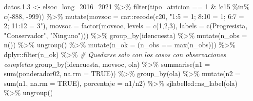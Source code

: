 \documentclass[
  12pt,
]{book}
\newenvironment{Shaded}{\begin{snugshade}}{\end{snugshade}}
\newcommand{\AttributeTok}[1]{\textcolor[rgb]{0.77,0.63,0.00}{#1}}
\newcommand{\CommentTok}[1]{\textcolor[rgb]{0.56,0.35,0.01}{\textit{#1}}}
\newcommand{\ConstantTok}[1]{\textcolor[rgb]{0.00,0.00,0.00}{#1}}
\newcommand{\DecValTok}[1]{\textcolor[rgb]{0.00,0.00,0.81}{#1}}
\newcommand{\FloatTok}[1]{\textcolor[rgb]{0.00,0.00,0.81}{#1}}
\newcommand{\FunctionTok}[1]{\textcolor[rgb]{0.00,0.00,0.00}{#1}}
\newcommand{\NormalTok}[1]{#1}
\newcommand{\OtherTok}[1]{\textcolor[rgb]{0.56,0.35,0.01}{#1}}
\newcommand{\SpecialCharTok}[1]{\textcolor[rgb]{0.00,0.00,0.00}{#1}}
\newcommand{\StringTok}[1]{\textcolor[rgb]{0.31,0.60,0.02}{#1}}
\begin{document}
\begin{Shaded}
\begin{Highlighting}[]
\NormalTok{datos.}\FloatTok{1.3} \OtherTok{\textless{}{-}}\NormalTok{ elsoc\_long\_2016\_2021 }\SpecialCharTok{\%\textgreater{}\%}
  \FunctionTok{filter}\NormalTok{(tipo\_atricion }\SpecialCharTok{==} \DecValTok{1} \SpecialCharTok{\&} \SpecialCharTok{!}\NormalTok{c15 }\SpecialCharTok{\%in\%} \FunctionTok{c}\NormalTok{(}\SpecialCharTok{{-}}\DecValTok{888}\NormalTok{, }\SpecialCharTok{{-}}\DecValTok{999}\NormalTok{)) }\SpecialCharTok{\%\textgreater{}\%} 
  \FunctionTok{mutate}\NormalTok{(}\AttributeTok{movsoc =}\NormalTok{ car}\SpecialCharTok{::}\FunctionTok{recode}\NormalTok{(c20, }\StringTok{"1:5 = 1; 8:10 = 1; 6:7 = 2; 11:12 = 3"}\NormalTok{),}
         \AttributeTok{movsoc =} \FunctionTok{factor}\NormalTok{(movsoc, }\AttributeTok{levels =} \FunctionTok{c}\NormalTok{(}\DecValTok{1}\NormalTok{,}\DecValTok{2}\NormalTok{,}\DecValTok{3}\NormalTok{),}
                         \AttributeTok{labels =} \FunctionTok{c}\NormalTok{(}\StringTok{\textquotesingle{}Progresista\textquotesingle{}}\NormalTok{, }\StringTok{"Conservador"}\NormalTok{, }\StringTok{"Ninguno"}\NormalTok{))) }\SpecialCharTok{\%\textgreater{}\%}
  \FunctionTok{group\_by}\NormalTok{(idencuesta) }\SpecialCharTok{\%\textgreater{}\%}
  \FunctionTok{mutate}\NormalTok{(}\AttributeTok{n\_obs =} \FunctionTok{n}\NormalTok{()) }\SpecialCharTok{\%\textgreater{}\%}
  \FunctionTok{ungroup}\NormalTok{() }\SpecialCharTok{\%\textgreater{}\%} 
  \FunctionTok{mutate}\NormalTok{(}\AttributeTok{n\_ok =}\NormalTok{ (n\_obs }\SpecialCharTok{==} \FunctionTok{max}\NormalTok{(n\_obs))) }\SpecialCharTok{\%\textgreater{}\%} 
\NormalTok{  dplyr}\SpecialCharTok{::}\FunctionTok{filter}\NormalTok{(n\_ok) }\SpecialCharTok{\%\textgreater{}\%}  \CommentTok{\# Quedarse solo con los casos con observaciones completas}
  \FunctionTok{group\_by}\NormalTok{(idencuesta, movsoc, ola) }\SpecialCharTok{\%\textgreater{}\%} 
  \FunctionTok{summarise}\NormalTok{(}\AttributeTok{n1 =} \FunctionTok{sum}\NormalTok{(ponderador02, }\AttributeTok{na.rm =} \ConstantTok{TRUE}\NormalTok{)) }\SpecialCharTok{\%\textgreater{}\%}
  \FunctionTok{group\_by}\NormalTok{(ola) }\SpecialCharTok{\%\textgreater{}\%} 
  \FunctionTok{mutate}\NormalTok{(}\AttributeTok{n2 =} \FunctionTok{sum}\NormalTok{(n1, }\AttributeTok{na.rm =} \ConstantTok{TRUE}\NormalTok{), }\AttributeTok{porcentaje =}\NormalTok{ n1}\SpecialCharTok{/}\NormalTok{n2) }\SpecialCharTok{\%\textgreater{}\%} 
\NormalTok{  sjlabelled}\SpecialCharTok{::}\FunctionTok{as\_label}\NormalTok{(ola) }\SpecialCharTok{\%\textgreater{}\%} 
  \FunctionTok{ungroup}\NormalTok{()}


\end{Highlighting}
\end{Shaded}
\end{document}
